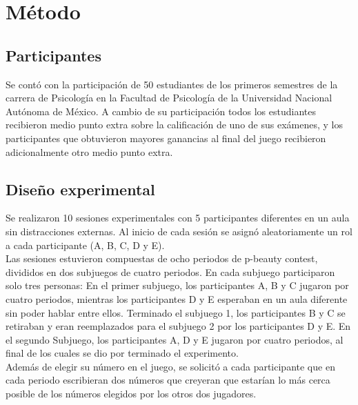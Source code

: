 
\chapter{Método} %

\label{Cap_Exp} %

\section{Participantes}

Se contó con la participación de 50 estudiantes de los primeros semestres de la carrera de Psicología en la Facultad de Psicología de la Universidad Nacional Autónoma de México. A cambio de su participación todos los estudiantes recibieron medio punto extra sobre la  calificación de uno de sus exámenes, y los participantes que obtuvieron mayores ganancias al final del juego recibieron adicionalmente otro medio punto extra.\\

\section{Diseño experimental}

Se realizaron 10 sesiones experimentales con 5 participantes diferentes en un aula sin distracciones externas. Al inicio de cada sesión se asignó aleatoriamente un rol a cada participante (A, B, C, D y E).\\

Las sesiones estuvieron compuestas de ocho periodos de p-beauty contest, divididos en dos subjuegos de cuatro periodos. En cada subjuego participaron solo tres personas: En el primer subjuego, los participantes A, B y C jugaron por cuatro periodos, mientras los participantes D y E esperaban en un aula diferente sin poder hablar entre ellos. Terminado el subjuego 1, los participantes B y C se retiraban y eran reemplazados para el subjuego 2 por los participantes D y E. En el segundo Subjuego, los participantes A, D y E jugaron por cuatro periodos, al final de los cuales se dio por terminado el experimento.\\

Además de elegir su número en el juego, se solicitó a cada participante que en cada periodo escribieran dos números que creyeran que estarían lo más cerca posible de los números elegidos por los otros dos jugadores.\\

